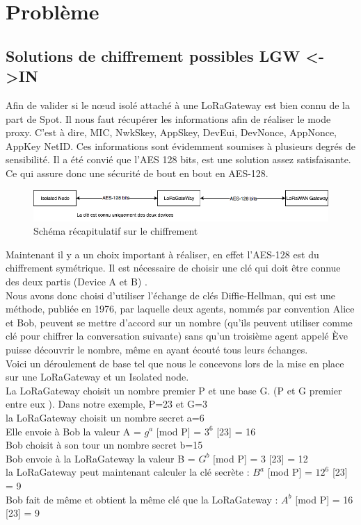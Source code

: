 \chapter{Problème}
\section{Solutions de chiffrement possibles LGW <->IN}
Afin de valider si le n\oe{}ud isolé attaché à une LoRaGateway est bien connu de la part de Spot. Il nous faut récupérer les informations afin de réaliser le mode proxy. C'est à dire, MIC, NwkSkey, AppSkey, DevEui, DevNonce, AppNonce, AppKey NetID. Ces informations sont évidemment soumises à plusieurs degrés de sensibilité. Il a été convié que l'AES 128 bits, est une solution assez satisfaisante. Ce qui assure donc une sécurité de bout en bout en AES-128.

\begin{figure}[!ht]    \centering
   \includegraphics[scale=0.6]{aes-128.png} 
   \caption{Schéma récapitulatif sur le chiffrement}
   \label{Schéma récapitulatif sur le chiffrement}
\end{figure}
Maintenant il y a un choix important à réaliser, en effet l'AES-128 est du chiffrement symétrique. Il est nécessaire de choisir une clé qui doit être connue des deux partis (Device A et B) . \\
Nous avons donc choisi d'utiliser l'échange de clés Diffie-Hellman, qui est une méthode, publiée en 1976, par laquelle deux agents, nommés par convention Alice et Bob, peuvent se mettre d'accord sur un nombre (qu'ils peuvent utiliser comme clé pour chiffrer la conversation suivante) sans qu'un troisième agent appelé Ève puisse découvrir le nombre, même en ayant écouté tous leurs échanges. \\

Voici un déroulement de base tel que nous le concevons lors de la mise en place sur une LoRaGateway et un Isolated node.\\
La LoRaGateway choisit un nombre premier P et une base G. (P et G premier entre eux ). Dans notre exemple, P=23 et G=3\\
la LoRaGateway choisit un nombre secret a=6\\
Elle envoie à Bob la valeur A = $g^a$ [mod P] = $3^6$ [23] = 16\\
Bob choisit à son tour un nombre secret b=15\\
Bob envoie à la LoRaGateway la valeur B = $G^b$ [mod P] = 3 [23] = 12\\
la LoRaGateway peut maintenant calculer la clé secrète : $B^a$ [mod P] = $12^6$ [23] = 9\\
Bob fait de même et obtient la même clé que la LoRaGateway : $A^b$ [mod P] = 16 [23] = 9\\

